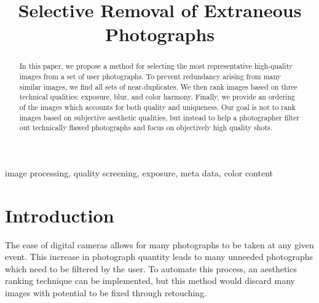 \documentclass{article}
\begin{document}
\sloppy

\title{
Selective Removal of Extraneous Photographs
}

\address{[ksamii,acarlisl]@ucsc.edu,[uliana,davis]@soe.ucsc.edu}

\maketitle	
\begin{abstract}
In this paper, we propose a method for selecting the most representative high-quality images from a set of user photographs. To prevent redundancy arising from many similar images, we find all sets of near-duplicates. We then rank images based on three technical qualities: exposure, blur, and color harmony. Finally, we provide an ordering of the images which accounts for both quality and uniqueness. Our goal is not to rank images based on subjective aesthetic qualities, but instead to help a photographer filter out technically flawed photographs and focus on objectively high quality shots.
\end{abstract}	

\begin{keywords}
image processing, quality screening, exposure, meta data, color content  %
\end{keywords}

\section{Introduction}
\label{sec:intro}

The ease of digital cameras allows for many photographs to be taken at any given event. This increase in photograph quantity leads to many unneeded photographs which need to be filtered by the user. To automate this process, an aesthetics ranking technique can be implemented, but this method would discard many images with potential to be fixed through retouching.	
\end{document}
